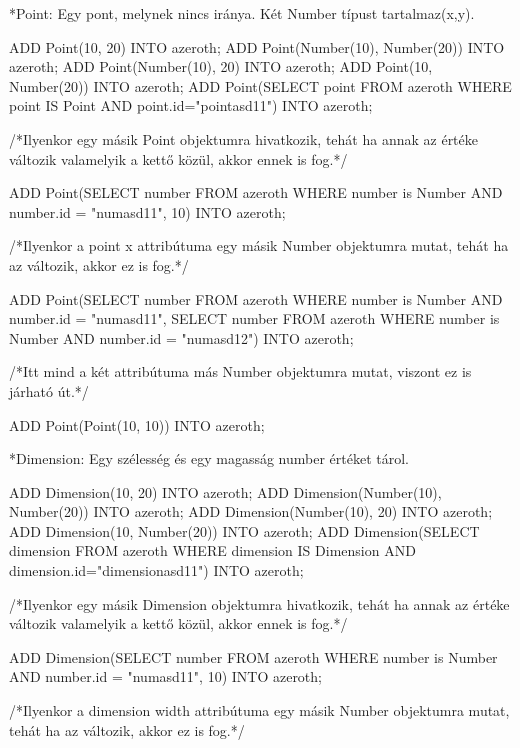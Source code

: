 *Point: Egy pont, melynek nincs iránya. Két Number típust tartalmaz(x,y).

\begin{sql}
ADD Point(10, 20) INTO azeroth;
ADD Point(Number(10), Number(20)) INTO azeroth;
ADD Point(Number(10), 20) INTO azeroth;
ADD Point(10, Number(20)) INTO azeroth;
ADD Point(SELECT point FROM azeroth WHERE point IS Point AND point.id="pointasd11") INTO azeroth;
\end{sql}

/*Ilyenkor egy másik Point objektumra hivatkozik, tehát ha annak az értéke változik valamelyik a kettő közül, akkor ennek is fog.*/

\begin{sql}
ADD Point(SELECT number FROM azeroth WHERE number is Number AND number.id = "numasd11", 10) INTO azeroth;
\end{sql}

/*Ilyenkor a point x attribútuma egy másik Number objektumra mutat, tehát ha az változik, akkor ez is fog.*/
\begin{sql}
ADD Point(SELECT number FROM azeroth WHERE number is Number AND number.id = "numasd11", SELECT number FROM azeroth WHERE number is Number AND number.id = "numasd12") INTO azeroth;
\end{sql}

/*Itt mind a két attribútuma más Number objektumra mutat, viszont ez is járható út.*/
\begin{sql}
ADD Point(Point(10, 10)) INTO azeroth;
\end{sql}

*Dimension: Egy szélesség és egy magasság number értéket tárol.
\begin{sql}
ADD Dimension(10, 20) INTO azeroth;
ADD Dimension(Number(10), Number(20)) INTO azeroth;
ADD Dimension(Number(10), 20) INTO azeroth;
ADD Dimension(10, Number(20)) INTO azeroth;
ADD Dimension(SELECT dimension FROM azeroth WHERE dimension IS Dimension AND dimension.id="dimensionasd11") INTO azeroth;
\end{sql}

/*Ilyenkor egy másik Dimension objektumra hivatkozik, tehát ha annak az értéke változik valamelyik a kettő közül, akkor ennek is fog.*/

\begin{sql}
ADD Dimension(SELECT number FROM azeroth WHERE number is Number AND number.id = "numasd11", 10) INTO azeroth;
\end{sql}

/*Ilyenkor a dimension width attribútuma egy másik Number objektumra mutat, tehát ha az változik, akkor ez is fog.*/

